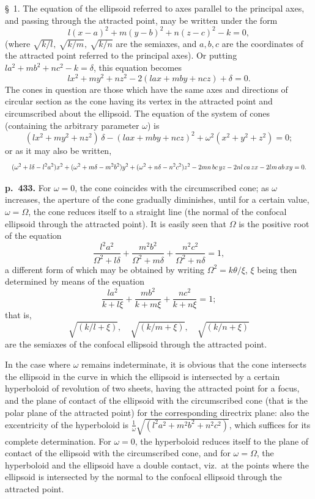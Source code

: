 \documentclass[11pt]{article}
\begin{document}
\smallskip
\S~1. The equation of the ellipsoid referred to axes parallel to the principal axes, and passing through the attracted point, may be written under the form
\[ l(x-a)^2 + m(y-b)^2 + n(z-c)^2 - k = 0, \]
(where $\sqrt{k/l},\ \sqrt{k/m},\ \sqrt{k/n}$ are the semiaxes, and $a,b,c$ are the coordinates of the attracted point referred to the principal axes). Or putting $la^2 + mb^2 + nc^2 - k = \delta$, this equation becomes
\[ lx^2 + my^2 + nz^2 - 2(lax + mby + ncz) + \delta = 0. \]
The cones in question are those which have the same axes and directions of circular section as the cone having its vertex in the attracted point and circumscribed about the ellipsoid. The equation of the system of cones (containing the arbitrary parameter $\omega$) is
\[ (lx^2 + my^2 + nz^2)\,\delta - (lax + mby + ncz)^2 + \omega^2(x^2 + y^2 + z^2) = 0; \]
or as it may also be written,
\[ \resizebox{\textwidth}{!}{$\displaystyle (\omega^2 + l\delta - l^2 a^2)x^2 + (\omega^2 + m\delta - m^2 b^2)y^2 + (\omega^2 + n\delta - n^2 c^2)z^2 - 2mn\,bc\,yz - 2nl\,ca\,zx - 2lm\,ab\,xy = 0.$} \]

\bigskip
\noindent\textbf{p.~433.} For $\omega = 0$, the cone coincides with the circumscribed cone; as $\omega$ increases, the aperture of the cone gradually diminishes, until for a certain value, $\omega = \Omega$, the cone reduces itself to a straight line (the normal of the confocal ellipsoid through the attracted point). It is easily seen that $\Omega$ is the positive root of the equation
\[ \frac{l^2 a^2}{\Omega^2 + l\delta} + \frac{m^2 b^2}{\Omega^2 + m\delta} + \frac{n^2 c^2}{\Omega^2 + n\delta} = 1, \]
a different form of which may be obtained by writing $\Omega^2 = k\theta/\xi$, $\xi$ being then determined by means of the equation
\[ \frac{la^2}{k + l\xi} + \frac{mb^2}{k + m\xi} + \frac{nc^2}{k + n\xi} = 1; \]
that is,
\[ \sqrt{(k/l + \xi)},\quad \sqrt{(k/m + \xi)},\quad \sqrt{(k/n + \xi)} \]
are the semiaxes of the confocal ellipsoid through the attracted point.

In the case where $\omega$ remains indeterminate, it is obvious that the cone intersects the ellipsoid in the curve in which the ellipsoid is intersected by a certain hyperboloid of revolution of two sheets, having the attracted point for a focus, and the plane of contact of the ellipsoid with the circumscribed cone (that is the polar plane of the attracted point) for the corresponding directrix plane: also the excentricity of the hyperboloid is $\tfrac{1}{\omega}\sqrt{(l^2 a^2 + m^2 b^2 + n^2 c^2)}$, which suffices for its complete determination. For $\omega = 0$, the hyperboloid reduces itself to the plane of contact of the ellipsoid with the circumscribed cone, and for $\omega = \Omega$, the hyperboloid and the ellipsoid have a double contact, viz.\ at the points where the ellipsoid is intersected by the normal to the confocal ellipsoid through the attracted point.
\end{document}
